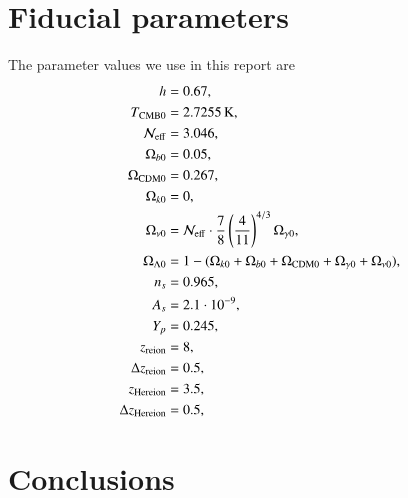 \documentclass{aa}
\begin{document}
\section{Fiducial parameters} \label{app:M1:fiducial_parameters}
The parameter values we use in this report are 
\begin{equation} \label{eq:Appendix:Fiducial_cosmology_parameters}
      \begin{split}
            h &= 0.67, \\ 
            T_\mathrm{CMB0} &= 2.7255\,\mathrm{K}, \\
            \mathcal{N}_\mathrm{eff} &= 3.046, \\
            \Omega_{b0} &= 0.05, \\
            \Omega_\mathrm{CDM0} &= 0.267,\\
            \Omega_{k0} &=0,\\
            \Omega_{\nu 0} &= \mathcal{N}_\mathrm{eff} \cdot \frac{7}{8} \left( \frac{4}{11} \right)^{4/3} \Omega_{\gamma 0}, \\
            \Omega_{\Lambda 0} &= 1 - (\Omega_{k0} + \Omega_{b0} + \Omega_\mathrm{CDM0} + \Omega_{\gamma 0} + \Omega_{\nu 0}), \\
            n_s &= 0.965,\\
            A_s &= 2.1\cdot 10^{-9},\\
            Y_p &= 0.245, \\
            z_\mathrm{reion} &= 8, \\
            \Delta z_\mathrm{reion} &= 0.5, \\
            z_\mathrm{Hereion} &= 3.5, \\
            \Delta z_\mathrm{Hereion} &= 0.5, \\
      \end{split}
\end{equation}   













\section{Conclusions}
\end{document}
